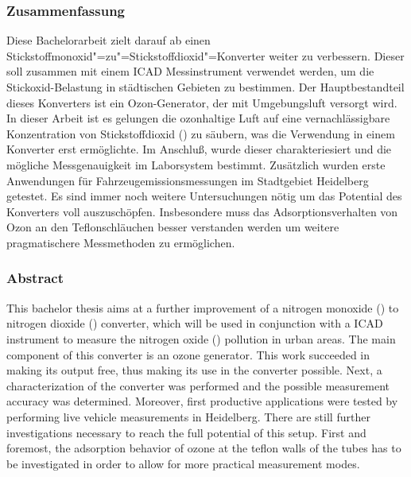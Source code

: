 
\subsubsection*{Zusammenfassung}
\label{sec:Zusammenfassung}

Diese Bachelorarbeit zielt darauf ab einen
Stickstoffmonoxid"=zu"=Stickstoffdioxid"=Konverter weiter zu
verbessern. Dieser soll zusammen mit einem  ICAD
Messinstrument verwendet werden, um die Stickoxid-Belastung in
städtischen Gebieten zu bestimmen. Der Hauptbestandteil dieses
Konverters ist ein Ozon-Generator, der mit Umgebungsluft versorgt
wird. In dieser Arbeit ist es gelungen die ozonhaltige Luft auf eine
vernachlässigbare Konzentration von Stickstoffdioxid () zu
säubern, was die Verwendung in einem Konverter erst ermöglichte. Im
Anschluß, wurde dieser charakteriesiert und die mögliche 
Messgenauigkeit im Laborsystem bestimmt. Zusätzlich wurden erste
Anwendungen für Fahrzeugemissionsmessungen im Stadtgebiet Heidelberg
getestet. Es sind immer noch weitere Untersuchungen nötig um das
Potential des Konverters voll auszuschöpfen. Insbesondere muss das
Adsorptionsverhalten von Ozon an den Teflonschläuchen besser
verstanden werden um weitere pragmatischere Messmethoden zu
ermöglichen.


\subsubsection*{Abstract}
\label{sec:abstract}

This bachelor thesis aims at a further improvement of a nitrogen
monoxide () to nitrogen dioxide () converter, which
will be used in conjunction with a  ICAD instrument to
measure the nitrogen oxide () pollution in urban areas. The
main component of this converter is an ozone generator. This work
succeeded in making its output  free, thus making its use in
the converter possible. Next, a characterization of the converter was
performed and the possible  measurement accuracy was
determined. Moreover, first productive applications were tested by
performing live vehicle measurements in Heidelberg. There are still
further investigations necessary to reach the full potential of this
setup. First and foremost, the adsorption behavior of ozone at the
teflon walls of the tubes has to be investigated in order to allow for
more practical measurement modes.

